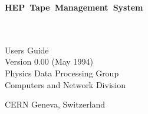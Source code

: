 
\begin{titlepage}
\vspace*{-23mm}
\mbox{}
\hfill
{}\hbox{\Large\bf HEP Tape Management System}
\hfill\mbox{}
\begin{center}
\mbox{}\\[10mm]
\mbox{}\\[2cm]
{\LARGE Users Guide}\\[1cm]
{\LARGE Version 0.00 (May 1994)}\\[2cm]
{\Large Physics Data Processing Group}\\[1cm]
{\Large Computers and Network Division}\\[2cm]
\end{center}
\vfill
\begin{center}\Large CERN Geneva, Switzerland\end{center}
\end{titlepage}


